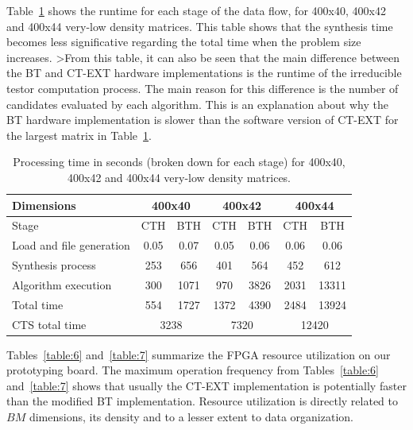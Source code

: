 \documentclass[authoryear,preprint,review,12pt]{elsarticle}
\begin{document}
Table~\ref{table:8} shows the runtime for each stage of the data flow, for 
400x40, 400x42 and 400x44 very-low density matrices. This table shows that the synthesis time 
becomes less significative regarding the total time when the problem size increases. 
>From this table, it can also be seen that the main difference between the BT and CT-EXT hardware 
implementations is the runtime of the irreducible testor computation process. The main reason for 
this difference is the number of candidates evaluated by each algorithm. This is an explanation 
about why the BT hardware implementation is slower than the software version of CT-EXT for the 
largest matrix in Table~\ref{table:8}.


\begin{table}[htb]
\caption{Processing time in seconds (broken down for each stage) for 
400x40, 400x42 and 400x44 very-low density matrices.} \label{table:8}
\begin{center}
    \begin{tabular}{lcccccc}   \hline
    	   Dimensions                & \multicolumn{2}{c}{400x40} & \multicolumn{2}{c}{400x42} 
    	                             & \multicolumn{2}{c}{400x44} \\ \hline
    	    	Stage	        			& CTH & BTH	& CTH & BTH & CTH & BTH \\ \hline
    	    Load and file generation & 0.05& 0.07& 0.05& 0.06& 0.06& 0.06\\
    	    Synthesis process        & 253 & 656 & 401 & 564 & 452 & 612\\
    	    Algorithm execution      & 300 & 1071& 970 & 3826& 2031& 13311\\ \hline
    	    Total time               & 554 & 1727& 1372& 4390& 2484& 13924\\ \hline
    	    CTS total time               & \multicolumn{2}{c}{3238} & \multicolumn{2}{c}{7320} 
    	    								& \multicolumn{2}{c}{12420}\\ \hline
    	    
    \end{tabular}
\end{center}
\end{table}

Tables~\ref{table:6} and~\ref{table:7} summarize the FPGA resource utilization on our prototyping board. 
The maximum operation frequency from Tables~\ref{table:6} and~\ref{table:7} shows that usually the CT-EXT 
implementation is potentially faster than the modified BT implementation. Resource utilization is 
directly related to $BM$ dimensions, its density and to a lesser extent to data organization.
\end{document}
